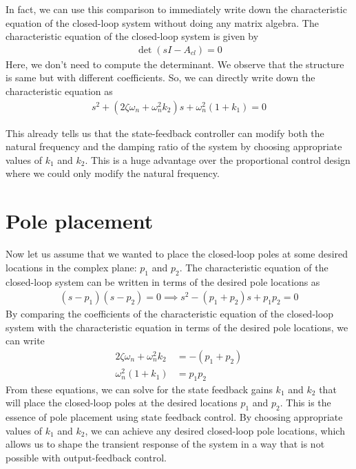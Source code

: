 \documentclass{ee122_notes}
\begin{document}
In fact, we can use this comparison to immediately write down the characteristic equation of the closed-loop system without doing any matrix algebra. The characteristic equation of the closed-loop system is given by
\begin{align*}
    \det(sI - A_{cl}) = 0
\end{align*}
Here, we don't need to compute the determinant. We observe that the structure is same but with different coefficients. So, we can directly write down the characteristic equation as
\begin{align*}
    s^2 + (2\zeta \omega_n + \omega_n^2 k_2)s + \omega_n^2 (1 + k_1) = 0
\end{align*}

This already tells us that the state-feedback controller can modify both the natural frequency and the damping ratio of the system by choosing appropriate values of $k_1$ and $k_2$. This is a huge advantage over the proportional control design where we could only modify the natural frequency.

\section{Pole placement}
Now let us assume that we wanted to place the closed-loop poles at some desired locations in the complex plane: $p_1$ and $p_2$. The characteristic equation of the closed-loop system can be written in terms of the desired pole locations as
\begin{align*}
    (s - p_1)(s - p_2) = 0 \implies s^2 - (p_1 + p_2)s + p_1 p_2 = 0
\end{align*}
By comparing the coefficients of the characteristic equation of the closed-loop system with the characteristic equation in terms of the desired pole locations, we can write
\begin{align*}
    2\zeta \omega_n + \omega_n^2 k_2 &= -(p_1 + p_2) \\
    \omega_n^2 (1 + k_1) &= p_1 p_2
\end{align*}
From these equations, we can solve for the state feedback gains $k_1$ and $k_2$ that will place the closed-loop poles at the desired locations $p_1$ and $p_2$. This is the essence of pole placement using state feedback control. By choosing appropriate values of $k_1$ and $k_2$, we can achieve any desired closed-loop pole locations, which allows us to shape the transient response of the system in a way that is not possible with output-feedback control.
\end{document}
